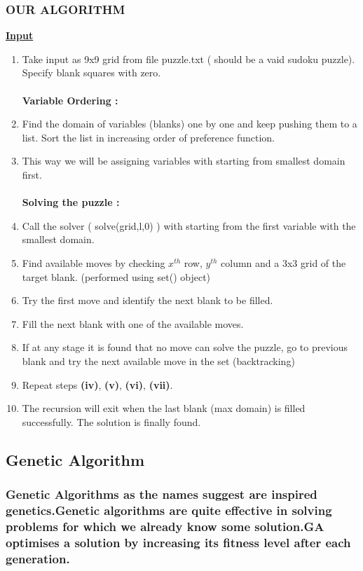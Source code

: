 \documentclass[11pt]{article}
\begin{document}
\subsubsection{OUR ALGORITHM}
\underline{\textbf{Input}}\\
\begin{enumerate}[label=(\roman*)]
\item Take input as 9x9 grid from file puzzle.txt ( should be a vaid sudoku puzzle).\\
Specify blank squares with zero.\\
\\
\textbf{Variable Ordering :}\\
\item Find the domain of variables (blanks) one by one and keep pushing them to a list. Sort the list in increasing order of preference function.
\item This way we will be assigning variables with starting from smallest domain first.\\
\\
\textbf{Solving the puzzle :}\\
\item Call the solver ( solve(grid,l,0) ) with starting from the first variable with the smallest domain.
\item Find available moves by checking \(x^{th} \) row, \(y^{th} \) column and a 3x3 grid of the target blank. (performed using set() object)
\item Try the first move and identify the next blank to be filled.
\item Fill the next blank with one of the available moves.
\item If at any stage it is found that no move can solve the puzzle, go to previous blank and try the next available move in the set (backtracking)
\item Repeat steps \textbf{(iv)}, \textbf{(v)}, \textbf{(vi)}, \textbf{(vii)}.
\item The recursion will exit when the last blank (max domain) is filled successfully. The solution is finally found.
\end{enumerate}
\subsection{Genetic Algorithm}
\subsubsection{Genetic Algorithms as the names suggest are inspired genetics.Genetic algorithms are quite effective in solving problems for which we already know some solution.GA optimises a solution by increasing its fitness level after each generation.}
\end{document}
